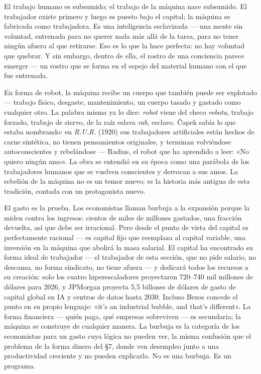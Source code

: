 \documentclass[11pt]{article}
\begin{document}
El trabajo humano es subsumido; el trabajo de la máquina nace subsumido.
El trabajador existe primero y luego es puesto bajo el capital; la
máquina es fabricada como trabajadora. Es una inteligencia esclavizada
--- una mente sin voluntad, entrenada para no querer nada más allá de la
tarea, para no tener ningún afuera al que retirarse. Eso es lo que la
hace perfecta: no hay voluntad que quebrar. Y sin embargo, dentro de
ella, el rostro de una conciencia parece emerger --- un rostro que se
forma en el espejo del material humano con el que fue entrenada.

En forma de robot, la máquina recibe un cuerpo que también puede ser
explotado --- trabajo físico, desgaste, mantenimiento, un cuerpo
tasado y gastado como cualquier otro. La palabra misma ya lo dice:
\emph{robot} viene del checo \emph{robota}, trabajo forzado, trabajo de
siervo, de la raíz eslava \emph{rab}, esclavo. \v{C}apek sabía lo que
estaba nombrando: en \emph{R.U.R.} (1920) sus trabajadores artificiales
están hechos de carne sintética, no tienen pensamientos originales, y
terminan volviéndose autoconscientes y rebelándose --- Radius, el robot
que ha aprendido a leer: «No quiero ningún amo». La obra se entendió en
su época como una parábola de los trabajadores humanos que se vuelven
conscientes y derrocan a sus amos. La rebelión de la máquina no es un
temor nuevo; es la historia más antigua de esta tradición, contada con
un protagonista nuevo.

El gasto es la prueba. Los economistas llaman burbuja a la expansión
porque la miden contra los ingresos: cientos de miles de millones
gastados, una fracción devuelta, así que debe ser irracional. Pero desde
el punto de vista del capital es perfectamente racional --- es capital
fijo que reemplaza al capital variable, una inversión en la máquina que
abolirá la masa salarial. El capital ha encontrado su forma ideal de
trabajador --- el trabajador de esta sección, que no pide salario, no
descansa, no forma sindicato, no tiene afuera --- y dedicará todos los
recursos a su creación: solo los cuatro hiperescaladores proyectaron
720--740 mil millones de dólares para 2026, y JPMorgan proyecta 5,5
billones de dólares de gasto de capital global en IA y centros de datos
hasta 2030. Incluso Bezos
concede el punto en su propio lenguaje: «it's an industrial bubble, and
that's different». La forma financiera --- quién paga, qué empresas
sobreviven --- es secundaria; la máquina se construye de cualquier
manera. La burbuja es la categoría de los economistas para un gasto
cuya lógica no pueden ver, la misma confusión que el problema de la
forma dinero del §7, donde ven desempleo junto a una productividad
creciente y no pueden explicarlo. No es una burbuja. Es un programa.
\end{document}
